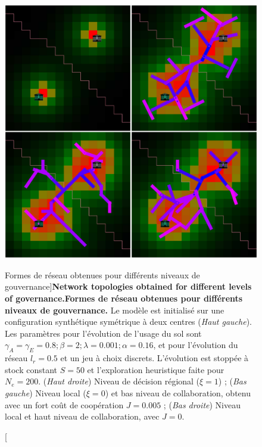 \begin{figure}
	\includegraphics[width=\linewidth]{Figures/Final/7-3-3-fig-lutecia-governance.jpg}
	\caption[Network topologies obtained for different levels of governance][Formes de réseau obtenues pour différents niveaux de gouvernance]{\textbf{Network topologies obtained for different levels of governance.}\label{fig:lutecia:governance}}{\textbf{Formes de réseau obtenues pour différents niveaux de gouvernance.} Le modèle est initialisé sur une configuration synthétique symétrique à deux centres (\textit{Haut gauche}). Les paramètres pour l'évolution de l'usage du sol sont $\gamma_A = \gamma_E = 0.8 ; \beta = 2 ; \lambda = 0.001 ; \alpha = 0.16$, et pour l'évolution du réseau $l_r = 0.5$ et un jeu à choix discrets. L'évolution est stoppée à stock constant $S = 50$ et l'exploration heuristique faite pour $N_e = 200$. (\textit{Haut droite}) Niveau de décision régional ($\xi = 1$) ; (\textit{Bas gauche}) Niveau local ($\xi = 0$) et bas niveau de collaboration, obtenu avec un fort coût de coopération $J=0.005$ ; (\textit{Bas droite}) Niveau local et haut niveau de collaboration, avec $J=0$.\label{fig:lutecia:governance}}
\end{figure}








